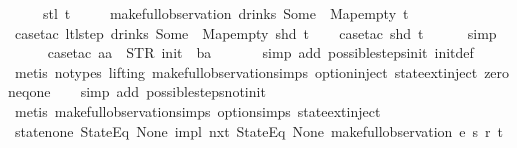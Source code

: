 \begin{isabellebody}
\ \ \ \ \ {\isacharparenleft}stl\ t{\isacharparenright}\ {\isasymnoteq}\isanewline
\ \ \ \ make{\isacharunderscore}full{\isacharunderscore}observation\ drinks\ {\isacharparenleft}Some\ {}{\isacharparenright}\ Map{\isachardot}empty\ t{\isachardoublequoteclose}\isanewline
%
\isadelimproof
\ \ %
\endisadelimproof
%
\isatagproof
{}\isamarkupfalse%
\ {\isacharparenleft}case{\isacharunderscore}tac\ {\isachardoublequoteopen}ltl{\isacharunderscore}step\ drinks\ {\isacharparenleft}Some\ {}{\isacharparenright}\ Map{\isachardot}empty\ {\isacharparenleft}shd\ t{\isacharparenright}{\isachardoublequoteclose}{\isacharparenright}\isanewline
\ \ \isamarkupfalse%
\ {\isacharparenleft}case{\isacharunderscore}tac\ {\isachardoublequoteopen}shd\ t{\isachardoublequoteclose}{\isacharparenright}\isanewline
\ \ \ \ \isamarkupfalse%
\ simp\isanewline
\ \ \ \ \isamarkupfalse%
\ {\isacharparenleft}case{\isacharunderscore}tac\ {\isachardoublequoteopen}aa\ {\isacharequal}\ STR\ {\isacharprime}{\isacharprime}init{\isacharprime}{\isacharprime}\ {\isasymand}\ ba\ {\isacharequal}\ {\isacharbrackleft}{\isacharbrackright}{\isachardoublequoteclose}{\isacharparenright}\isanewline
\ \ \ \isamarkupfalse%
\ {\isacharparenleft}simp\ add{\isacharcolon}\ possible{\isacharunderscore}steps{\isacharunderscore}init\ init{\isacharunderscore}def{\isacharparenright}\isanewline
\ \ \isamarkupfalse%
\ {\isacharparenleft}metis\ {\isacharparenleft}no{\isacharunderscore}types{\isacharcomma}\ lifting{\isacharparenright}\ make{\isacharunderscore}full{\isacharunderscore}observation{\isachardot}simps{\isacharparenleft}{}{\isacharparenright}\ option{\isachardot}inject\ state{\isachardot}ext{\isacharunderscore}inject\ zero{\isacharunderscore}neq{\isacharunderscore}one{\isacharparenright}\isanewline
\ \ \isamarkupfalse%
\ {\isacharparenleft}simp\ add{\isacharcolon}\ possible{\isacharunderscore}steps{\isacharunderscore}not{\isacharunderscore}init{\isacharparenright}\isanewline
\ \ \isamarkupfalse%
\ {\isacharparenleft}metis\ make{\isacharunderscore}full{\isacharunderscore}observation{\isachardot}simps{\isacharparenleft}{}{\isacharparenright}\ option{\isachardot}simps{\isacharparenleft}{}{\isacharparenright}\ state{\isachardot}ext{\isacharunderscore}inject{\isacharparenright}%
\endisatagproof
{\isafoldproof}%
%
\isadelimproof
\isanewline
%
\endisadelimproof
\isanewline
{}\isamarkupfalse%
\ state{\isacharunderscore}none{\isacharcolon}\ {\isachardoublequoteopen}{\isacharparenleft}{\isacharparenleft}StateEq\ None{\isacharparenright}\ impl\ nxt\ {\isacharparenleft}StateEq\ None{\isacharparenright}{\isacharparenright}\ {\isacharparenleft}make{\isacharunderscore}full{\isacharunderscore}observation\ e\ s\ r\ t{\isacharparenright}{\isachardoublequoteclose}\isanewline

\end{isabellebody}
